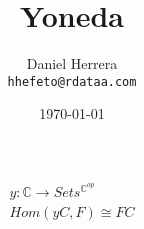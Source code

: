 \documentclass{article}
\title{Yoneda}
\author{Daniel Herrera\\\texttt{hhefeto@rdataa.com}}
\date\today
\begin{document}
\maketitle

\begin{center}





  \begin{gather*}
    y \colon \pmb{\mathbb{C}} \longrightarrow Sets^ {\pmb{\mathbb{C}}^{op}} \\
    Hom(y C,F) \cong FC
  \end{gather*}


\end{center}
\end{document}
